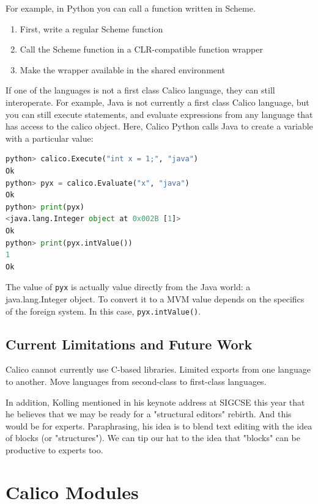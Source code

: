 \documentclass[preprint]{sigplanconf}
\begin{document}
For example, in Python you can call a function written in Scheme.

\begin{enumerate}
\item First, write a regular Scheme function
\item Call the Scheme function in a CLR-compatible function wrapper
\item Make the wrapper available in the shared environment
\end{enumerate}

If one of the languages is not a first class Calico language, they can
still interoperate. For example, Java is not currently a first class
Calico language, but you can still execute statements, and evaluate
expressions from any language that has access to the calico
object. Here, Calico Python calls Java to create a variable with a
particular value:

\begin{lstlisting}[language=Python, caption={Calling Java from Python.}, label={callingjava1}]
python> calico.Execute("int x = 1;", "java")
Ok
python> pyx = calico.Evaluate("x", "java")
Ok
python> print(pyx) 
<java.lang.Integer object at 0x002B [1]>
Ok
python> print(pyx.intValue())
1
Ok
\end{lstlisting}

The value of \texttt{pyx} is actually value directly from the Java world: a
java.lang.Integer object. To convert it to a MVM value depends on the
specifics of the foreign system. In this case, \texttt{pyx.intValue()}.

\subsection{Current Limitations and Future Work}

Calico cannot currently use C-based libraries.
Limited exports from one language to another.
Move languages from second-class to first-class languages.

In addition, Kolling mentioned in his keynote address at SIGCSE this
year that he believes that we may be ready for a "structural editors"
rebirth. And this would be for experts. Paraphrasing, his idea is to
blend text editing with the idea of blocks (or "structures"). We can
tip our hat to the idea that "blocks" can be productive to experts
too.

\section{Calico Modules}
\end{document}
